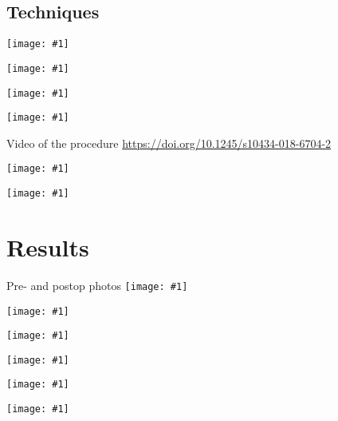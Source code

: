 \documentclass{beamer}
\newcommand*{\solo}[1]{\centering\texttt{[image: \#1]}}
\begin{document}
\subsection{Techniques}
\begin{frame}
    \solo{F1a.png}
\end{frame}

\begin{frame}
    \solo{F1d.png}
\end{frame}

\begin{frame}
    \solo{F1f.png}
\end{frame}

\begin{frame}
    \solo{F1h.png}
\end{frame}

\begin{frame}{Video of the procedure}
    \centering\url{https://doi.org/10.1245/s10434-018-6704-2}
\end{frame}

\begin{frame}
    \solo{F2a.jpg}
\end{frame}

\begin{frame}
    \solo{F2d.jpg}
\end{frame}

\section{Results}
\begin{frame}{Pre- and postop photos}
    \solo{F3a.jpg}
\end{frame}

\begin{frame}
    \solo{F3g.eps}
\end{frame}

\begin{frame}
    \solo{T1a.eps}
\end{frame}

\begin{frame}
    \solo{T1b.eps}
\end{frame}

\begin{frame}
    \solo{T1c.eps}
\end{frame}

\begin{frame}
    \solo{T1d.eps}
\end{frame}
\end{document}
